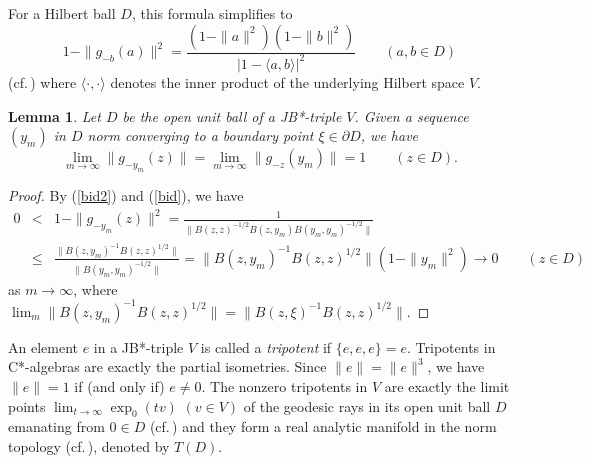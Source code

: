 \documentclass[12pt, twoside]{article}
\newtheorem{lemma}[theorem]{Lemma}
\theoremstyle{definition}
\numberwithin{equation}{section}
\begin{document}
For a Hilbert ball $D$, this formula simplifies to
\begin{equation}\label{hh}
1-\|g_{-b}(a)\|^2 = \frac{(1-\|a\|^2)(1-\|b\|^2)}{|1-\langle a,b\rangle|^2} \qquad (a,b\in D)
\end{equation}
(cf.\,\cite[Example 3.2.29]{book2})
where $\langle\cdot,\cdot\rangle$ denotes the inner product of the underlying Hilbert space $V$.


 \begin{lemma}\label{hhh} Let $D$ be  the open unit ball of a JB*-triple $V$.
Given a sequence $(y_m)$ in $D$  norm converging to a boundary point $\xi \in \partial D$, we have
\begin{equation}\label{z}
\lim_{m\rightarrow \infty}\|g_{-y_m}(z)\| = \lim_{m\rightarrow \infty} \|g_{-z}(y_m)\|=1 \qquad (z\in D).
\end{equation}
\end{lemma}
\begin{proof}
By (\ref{bid2}) and (\ref{bid}), we have
\begin{eqnarray*}
0 &<& 1- \|g_{-y_m}(z)\|^2 = \frac{1}{\|B(z,z)^{-1/2}B(z, y_m)B(y_m, y_m)^{-1/2}\|}\\
&\leq& \frac{\|B(z, y_m)^{-1}B(z, z)^{1/2}\|}{\|B(y_m, y_m)^{-1/2}\|}
= \|B(z, y_m)^{-1}B(z, z)^{1/2}\|(1-\|y_m\|^2) \longrightarrow 0 \qquad (z\in D)
\end{eqnarray*}
as $m \rightarrow \infty$, where $\lim_m \|B(z, y_m)^{-1}B(z, z)^{1/2}\|=
\|B(z,\xi)^{-1}B(z, z)^{1/2}\|$.
\end{proof}

An element $e$ in a JB*-triple $V$ is called a {\it tripotent} if $\{e,e,e\}=e$.
Tripotents in C*-algebras are exactly the partial isometries.
Since $\|e\|= \|e\|^3$, we have $\|e\|=1$ if (and only if) $e \neq 0$.
The nonzero tripotents in $V$ are exactly the limit points $\lim_{t\rightarrow \infty} \exp_0(tv)$
$(v\in V)$
of the geodesic rays in its open unit ball $D$ emanating from $0\in D$ (cf.\,\cite[4.8]{LOOS})
and they form a real analytic manifold in the norm topology (cf.\,\cite[4.4]{sau}), denoted by $T(D)$.
\end{document}
